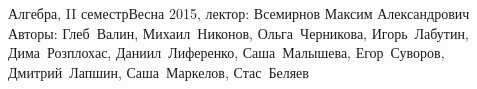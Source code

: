 


\BigHeader
	{Алгебра, II семестр}{Весна 2015, лектор: Всемирнов Максим Александрович}
	{Авторы: Глеб~Валин, Михаил~Никонов, Ольга~Черникова, Игорь~Лабутин, Дима~Розплохас, Даниил~Лиференко, Саша~Малышева, Егор~Суворов, 
	Дмитрий~Лапшин, Саша~Маркелов, Стас~Беляев}



























